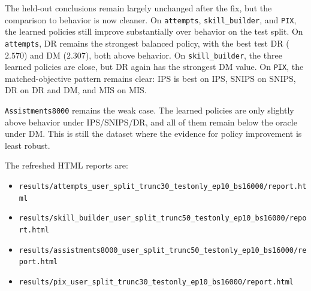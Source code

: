 The held-out conclusions remain largely unchanged after the fix, but the comparison to behavior is now cleaner. On \texttt{attempts}, \texttt{skill\_builder}, and \texttt{PIX}, the learned policies still improve substantially over behavior on the test split. On \texttt{attempts}, DR remains the strongest balanced policy, with the best test DR ($2.570$) and DM ($2.307$), both above behavior. On \texttt{skill\_builder}, the three learned policies are close, but DR again has the strongest DM value. On \texttt{PIX}, the matched-objective pattern remains clear: IPS is best on IPS, SNIPS on SNIPS, DR on DR and DM, and MIS on MIS.

\texttt{Assistments8000} remains the weak case. The learned policies are only slightly above behavior under IPS/SNIPS/DR, and all of them remain below the oracle under DM. This is still the dataset where the evidence for policy improvement is least robust.

The refreshed HTML reports are:
\begin{itemize}
\item \texttt{results/attempts\_user\_split\_trunc30\_testonly\_ep10\_bs16000/report.html}
\item \texttt{results/skill\_builder\_user\_split\_trunc50\_testonly\_ep10\_bs16000/report.html}
\item \texttt{results/assistments8000\_user\_split\_trunc50\_testonly\_ep10\_bs16000/report.html}
\item \texttt{results/pix\_user\_split\_trunc30\_testonly\_ep10\_bs16000/report.html}
\end{itemize}
